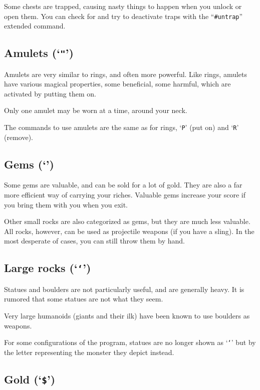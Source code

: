 Some chests are trapped, causing nasty things to happen when you
unlock or open them.  You can check for and try to deactivate traps
with the ``{\tt \#untrap}'' extended command.

\subsection*{Amulets (`{\tt "}')}

Amulets are very similar to rings, and often more powerful.  Like
rings, amulets have various magical properties, some beneficial,
some harmful, which are activated by putting them on.

Only one amulet may be worn at a time, around your neck.

The commands to use amulets are the same as for rings, `{\tt P}' (put on)
and `{\tt R}' (remove).

\subsection*{Gems (`{\tt *}')}

Some gems are valuable, and can be sold for a lot of gold.  They are also
a far more efficient way of carrying your riches.  Valuable gems increase
your score if you bring them with you when you exit.

Other small rocks are also categorized as gems, but they are much less
valuable.  All rocks, however, can be used as projectile weapons (if you
have a sling).  In the most desperate of cases, you can still throw them
by hand.

\subsection*{Large rocks (`{\tt `}')}
Statues and boulders are not particularly useful, and are generally
heavy.  It is rumored that some statues are not what they seem.

Very large humanoids (giants and their ilk) have been known to use boulders
as weapons.

For some configurations of the program, statues are no longer shown
as `{\tt `}'
but by the letter representing the monster they depict instead.

\subsection*{Gold (`{\tt \$}')}

